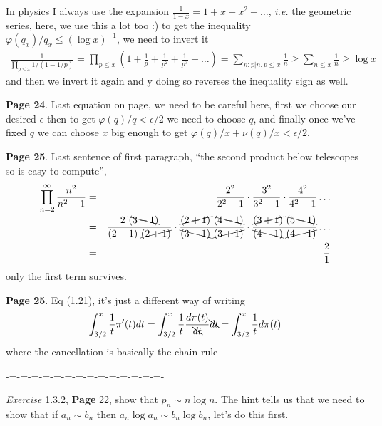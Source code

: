 \documentclass[aps,preprint,preprintnumbers,nofootinbib,showpacs,prd]{revtex4-1}
\newcommand{\ie}{{\it i.e.} }
\newcommand{\nbea}{\begin{eqnarray*}}
\newcommand{\neea}{\end{eqnarray*}}
\begin{document}
In physics I always use the expansion $\frac{1}{1-x} = 1 + x + x^2 + \dots$, \ie the geometric series, here, we use this a lot too :) to get the inequality $\varphi(q_x)/q_x \le (\log x)^{-1}$, we need to invert it
%
\nbea
\frac{1}{\prod_{p\le x}1/(1-1/p)} = \prod_{p\le x}\left(1 + \frac{1}{p} + \frac{1}{p^2} + \frac{1}{p^3} + \dots \right) = \sum_{n: p|n, p \le x} \frac{1}{n} \ge \sum_{n \le x} \frac{1}{n} \ge \log x
\neea
%
and then we invert it again and y doing so reverses the inequality sign as well.

{\bf Page 24}. Last equation on page, we need to be careful here, first we choose our desired $\epsilon$ then to get $\varphi(q)/q < \epsilon/2$ we need to choose $q$, and finally once we've fixed $q$ we can choose $x$ big enough to get $\varphi(q)/x + \nu(q)/x < \epsilon/2$.

{\bf Page 25}. Last sentence of first paragraph, ``the second product below telescopes so is easy to compute'', 
%
\nbea
\prod_{n=2}^\infty \frac{n^2}{n^2 - 1} & = & \frac{2^2}{2^2-1} \cdot \frac{3^2}{3^2 - 1} \cdot \frac{4^2}{4^2 - 1} \dots \\
& = & \frac{2~\bcancel{(3-1)}}{(2-1)~\cancel{(2+1)}} \cdot \frac{\cancel{(2+1)}~\bcancel{(4-1)}}{\bcancel{(3 - 1)}~\cancel{(3 + 1)}} \cdot \frac{\cancel{(3+1)}~\bcancel{(5-1)}}{\bcancel{(4 - 1)}~\cancel{(4+1)}} \dots \\
& = & \frac{2}{1}
\neea
%
only the first term survives.

{\bf Page 25}. Eq (1.21), it's just a different way of writing
%
\nbea
\int_{3/2}^x \frac{1}{t} \pi'(t) dt = \int_{3/2}^x \frac{1}{t} \frac{d\pi(t)}{\bcancel{dt}} \bcancel{dt} = \int_{3/2}^x \frac{1}{t} d\pi(t)
\neea
%
where the cancellation is basically the chain rule





-=-=-=-=-=-=-=-=-=-=-=-=-=-=-

{\it Exercise} 1.3.2, {\bf Page} 22, show that $p_n \sim n \log n$. The hint tells us that we need to show that if $a_n \sim b_n$ then $a_n \log a_n \sim b_n \log b_n$, let's do this first.
\end{document}
